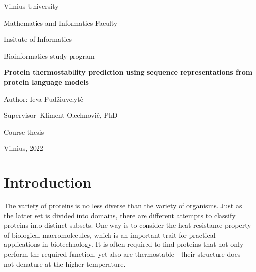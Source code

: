\documentclass[12pt]{article}
\begin{document}
	\begin{center}

	    \vspace*{1cm}
	    \Large
	    Vilnius University

		Mathematics and Informatics Faculty

		Insitute of Informatics 

		Bioinformatics study program
	    
        \vspace*{2cm}
        \Large
		\textbf{Protein thermostability prediction using 
		sequence representations from protein 
		language models}

	\end{center}

	\begin{flushright}

		\vspace*{2cm}
        \large
        Author: Ieva Pudžiuvelytė

        Supervisor: Kliment Olechnovič, PhD 
        
	\end{flushright}

	\begin{center}
		\vspace*{4cm}
        \large
        Course thesis
        
        \vspace*{2cm}
        \large
        Vilnius, 2022
	\end{center}
	
	\newpage

	\tableofcontents

	\newpage
	
	\Large
	\section{Introduction}

    \vspace*{1cm}
        
	\normalsize

	The variety of proteins is no less diverse than the variety of organisms. 
	Just as the latter set is divided into domains, there are different 
	attempts to classify proteins into distinct subsets. One way is to 
	consider the heat-resistance property of biological macromolecules, which 
	is an important trait for practical applications in biotechnology. It is 
	often required to find proteins that not only perform the required
	function, yet also are thermostable - their structure does not denature 
	at the higher temperature.
\end{document}
